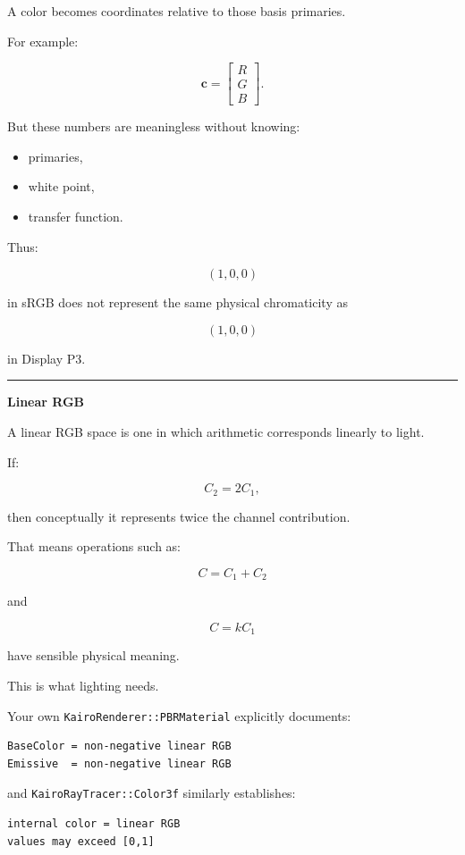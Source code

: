 A color becomes coordinates relative to those basis primaries.

For example:

\[
\mathbf c=
\begin{bmatrix}
R\\G\\B
\end{bmatrix}.
\]

But these numbers are meaningless without knowing:

\begin{itemize}
\tightlist
\item
  primaries,
\item
  white point,
\item
  transfer function.
\end{itemize}

Thus:

\[
(1,0,0)
\]

in sRGB does not represent the same physical chromaticity as

\[
(1,0,0)
\]

in Display P3.

\begin{center}\rule{0.5\linewidth}{0.5pt}\end{center}

\textbf{Linear RGB}

A linear RGB space is one in which arithmetic corresponds linearly to light.

If:

\[
C_2=2C_1,
\]

then conceptually it represents twice the channel contribution.

That means operations such as:

\[
C=C_1+C_2
\]

and

\[
C=kC_1
\]

have sensible physical meaning.

This is what lighting needs.

Your own \texttt{KairoRenderer::PBRMaterial} explicitly documents:

\begin{verbatim}
BaseColor = non-negative linear RGB
Emissive  = non-negative linear RGB
\end{verbatim}

and \texttt{KairoRayTracer::Color3f} similarly establishes:

\begin{verbatim}
internal color = linear RGB
values may exceed [0,1]
\end{verbatim}


